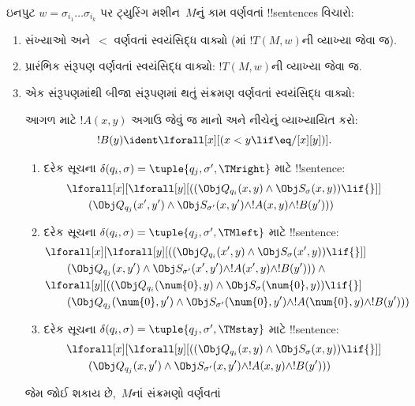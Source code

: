\documentclass[../../../include/open-logic-section]{subfiles}
\begin{document}
ઇનપુટ $w = \sigma_{i_1}\dots\sigma_{i_k}$ પર
ટ્યુરિંગ મશીન~$M$નું કામ વર્ણવતાં !!{sentence}s
વિચારો:
\begin{enumerate}
\item સંખ્યાઓ અને~$<$ વર્ણવતાં સ્વયંસિદ્ધ વાક્યો
  (માં $!T(M,w)$ની વ્યાખ્યા જેવા જ).
\item પ્રારંભિક સંરૂપણ વર્ણવતાં સ્વયંસિદ્ધ વાક્યો:
  $!T(M,w)$ની વ્યાખ્યા જેવા જ.
\item એક સંરૂપણમાંથી બીજા સંરૂપણમાં થતું સંક્રમણ
  વર્ણવતાં સ્વયંસિદ્ધ વાક્યો:

આગળ માટે $!A(x, y)$ અગાઉ જેવું જ માનો અને
નીચેનું વ્યાખ્યાયિત કરો:
\[
  !B(y) \ident \lforall[x][(x < y \lif \eq/[x][y])].
\]
\begin{enumerate}
\item {} દરેક સૂચના
  $\delta(q_i, \sigma) =
  \tuple{q_j, \sigma', \TMright}$ માટે !!{sentence}:
\begin{align*}
& \lforall[x][\lforall[y][(
   (\Obj Q_{q_i}(x, y) \land \Obj S_{\sigma}(x, y)) \lif {}]] \\
&\qquad   (\Obj Q_{q_j}(x', y') \land \Obj S_{\sigma'}(x, y') \land
!A(x, y) \land !B(y')))
\end{align*}
\item {} દરેક સૂચના
  $\delta(q_i, \sigma) =
  \tuple{q_j, \sigma', \TMleft}$ માટે !!{sentence}:
\begin{align*}
& \lforall[x][\lforall[y][
    ((\Obj Q_{q_i}(x', y) \land \Obj S_{\sigma}(x', y)) \lif {}]]\\
& \qquad   (\Obj Q_{q_j}(x, y') \land \Obj S_{\sigma'}(x', y') \land
!A(x', y) \land !B(y'))) \land {}\\
& \lforall[y][((\Obj Q_{q_i}(\num{0}, y) \land \Obj S_{\sigma}(\num{0},
    y)) \lif {}]\\
& \qquad (\Obj Q_{q_j}(\num{0}, y') \land \Obj S_{\sigma'}(\num{0},
  y') \land !A(\num{0}, y) \land !B(y')))
\end{align*}
\item {} દરેક સૂચના
  $\delta(q_i, \sigma) =
  \tuple{q_j, \sigma', \TMstay}$ માટે !!{sentence}:
\begin{align*}
& \lforall[x][\lforall[y][(
   (\Obj Q_{q_i}(x, y) \land \Obj S_{\sigma}(x, y)) \lif {}]] \\
&\qquad (\Obj Q_{q_j}(x, y') \land \Obj S_{\sigma'}(x, y') \land
!A(x, y) \land !B(y')))
\end{align*}
\end{enumerate}
જેમ જોઈ શકાય છે,~$M$નાં સંક્રમણો વર્ણવતાં

\end{enumerate}
\end{document}
